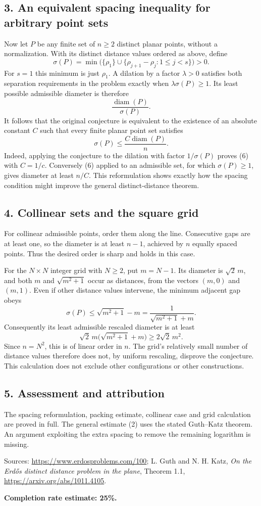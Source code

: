 \subsection*{3. An equivalent spacing inequality for arbitrary point sets}
Now let $P$ be any finite set of $n\ge2$ distinct planar points, without a normalization. With its distinct distance values ordered as above, define
\[
 \sigma(P)=\min\bigl(\{\rho_1\}\cup
             \{\rho_{j+1}-\rho_j:1\le j<s\}\bigr)>0.\tag{4}
\]
For $s=1$ this minimum is just $\rho_1$. A dilation by a factor $\lambda>0$ satisfies both separation requirements in the problem exactly when $\lambda\sigma(P)\ge1$. Its least possible admissible diameter is therefore
\[
 \frac{\operatorname{diam}(P)}{\sigma(P)}.\tag{5}
\]
It follows that the original conjecture is equivalent to the existence of an absolute constant $C$ such that every finite planar point set satisfies
\[
 \sigma(P)\le\frac{C\operatorname{diam}(P)}{n}.\tag{6}
\]
Indeed, applying the conjecture to the dilation with factor $1/\sigma(P)$ proves (6) with $C=1/c$. Conversely (6) applied to an admissible set, for which $\sigma(P)\ge1$, gives diameter at least $n/C$. This reformulation shows exactly how the spacing condition might improve the general distinct-distance theorem.

\subsection*{4. Collinear sets and the square grid}
For collinear admissible points, order them along the line. Consecutive gaps are at least one, so the diameter is at least $n-1$, achieved by $n$ equally spaced points. Thus the desired order is sharp and holds in this case.

For the $N\times N$ integer grid with $N\ge2$, put $m=N-1$. Its diameter is $\sqrt2\,m$, and both $m$ and $\sqrt{m^2+1}$ occur as distances, from the vectors $(m,0)$ and $(m,1)$. Even if other distance values intervene, the minimum adjacent gap obeys
\[
 \sigma(P)\le\sqrt{m^2+1}-m
 =\frac1{\sqrt{m^2+1}+m}.
\]
Consequently its least admissible rescaled diameter is at least
\[
 \sqrt2\,m\bigl(\sqrt{m^2+1}+m\bigr)
 \ge2\sqrt2\,m^2.
\]
Since $n=N^2$, this is of linear order in $n$. The grid's relatively small number of distance values therefore does not, by uniform rescaling, disprove the conjecture. This calculation does not exclude other configurations or other constructions.

\subsection*{5. Assessment and attribution}
The spacing reformulation, packing estimate, collinear case and grid calculation are proved in full. The general estimate (2) uses the stated Guth--Katz theorem. An argument exploiting the extra spacing to remove the remaining logarithm is missing.

Sources: \url{https://www.erdosproblems.com/100}; L. Guth and N. H. Katz, \emph{On the Erd\H{o}s distinct distance problem in the plane}, Theorem 1.1, \url{https://arxiv.org/abs/1011.4105}.

\textbf{Completion rate estimate: 25\%.}

